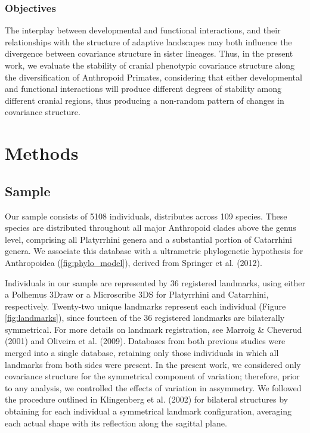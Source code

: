\documentclass[12pt,twoside]{report}
\begin{document}
\subsubsection{Objectives}\label{objectives-1}

The interplay between developmental and functional interactions, and
their relationships with the structure of adaptive landscapes may both
influence the divergence between covariance structure in sister
lineages. Thus, in the present work, we evaluate the stability of
cranial phenotypic covariance structure along the diversification of
Anthropoid Primates, considering that either developmental and
functional interactions will produce different degrees of stability
among different cranial regions, thus producing a non-random pattern of
changes in covariance structure.

\section{Methods}\label{methods-2}

\subsection{Sample}\label{sample-2}

Our sample consists of 5108 individuals, distributes across 109 species.
These species are distributed throughout all major Anthropoid clades
above the genus level, comprising all Platyrrhini genera and a
substantial portion of Catarrhini genera. We associate this database
with a ultrametric phylogenetic hypothesis for Anthropoidea
(\autoref{fig:phylo_model}), derived from Springer et al. (2012).

Individuals in our sample are represented by 36 registered landmarks,
using either a Polhemus 3Draw or a Microscribe 3DS for Platyrrhini and
Catarrhini, respectively. Twenty-two unique landmarks represent each
individual (Figure \ref{fig:landmarks}), since fourteen of the 36
registered landmarks are bilaterally symmetrical. For more details on
landmark registration, see Marroig \& Cheverud (2001) and Oliveira et
al. (2009). Databases from both previous studies were merged into a
single database, retaining only those individuals in which all landmarks
from both sides were present. In the present work, we considered only
covariance structure for the symmetrical component of variation;
therefore, prior to any analysis, we controlled the effects of variation
in assymmetry. We followed the procedure outlined in Klingenberg et al.
(2002) for bilateral structures by obtaining for each individual a
symmetrical landmark configuration, averaging each actual shape with its
reflection along the sagittal plane.
\end{document}
